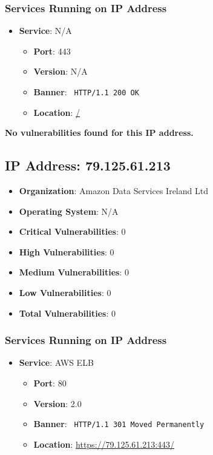 \documentclass{article}
\begin{document}
\subsubsection*{Services Running on IP Address}

\begin{itemize}
    
        \item \textbf{Service}: N/A
        \begin{itemize}
            \item \textbf{Port}: 443
            \item \textbf{Version}:  N/A 
            \item \textbf{Banner}: \texttt{ HTTP/1.1 200 OK
 }
            \item \textbf{Location}: \href{ / }{ / }
        \end{itemize}
    
\end{itemize}


\textbf{No vulnerabilities found for this IP address.}


\clearpage



\subsection*{IP Address: 79.125.61.213}

\begin{itemize}
    \item \textbf{Organization}: Amazon Data Services Ireland Ltd
    \item \textbf{Operating System}:  N/A 
    \item \textbf{Critical Vulnerabilities}: 0
    \item \textbf{High Vulnerabilities}: 0
    \item \textbf{Medium Vulnerabilities}: 0
    \item \textbf{Low Vulnerabilities}: 0
    \item \textbf{Total Vulnerabilities}: 0
\end{itemize}

\subsubsection*{Services Running on IP Address}

\begin{itemize}
    
        \item \textbf{Service}: AWS ELB
        \begin{itemize}
            \item \textbf{Port}: 80
            \item \textbf{Version}:  2.0 
            \item \textbf{Banner}: \texttt{ HTTP/1.1 301 Moved Permanently
 }
            \item \textbf{Location}: \href{ https://79.125.61.213:443/ }{ https://79.125.61.213:443/ }
        \end{itemize}
    
\end{itemize}
\end{document}
